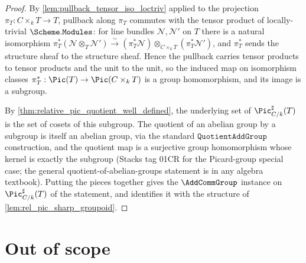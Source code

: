 \begin{proof}
  By \cref{lem:pullback_tensor_iso_loctriv} applied to the projection
  \(\pi_T : C \times_k T \to T\), pullback along \(\pi_T\) commutes with the
  tensor product of locally-trivial \(\Scheme.\mathtt{Modules}\): for line
  bundles \(\mathcal{N}, \mathcal{N}'\) on \(T\) there is a natural isomorphism
  \(\pi_T^*(\mathcal{N} \otimes_T \mathcal{N}')
     \xrightarrow{\sim}
   (\pi_T^*\mathcal{N}) \otimes_{C \times_k T} (\pi_T^*\mathcal{N}')\), and
  \(\pi_T^*\) sends the structure sheaf to the structure sheaf. Hence the
  pullback carries tensor products to tensor products and the unit to the
  unit, so the induced map on isomorphism classes
  \(\pi_T^{*} : \Pic(T) \to \Pic(C \times_k T)\) is a group homomorphism, and
  its image is a subgroup.

  By \cref{thm:relative_pic_quotient_well_defined}, the underlying set of
  \(\Pic^{\sharp}_{C/k}(T)\) is the set of cosets of this subgroup. The
  quotient of an abelian group by a subgroup is itself an abelian group, via
  the standard \(\mathtt{QuotientAddGroup}\) construction, and the quotient
  map is a surjective group homomorphism whose kernel is exactly the subgroup
  (Stacks tag 01CR for the Picard-group special case; the general
  quotient-of-abelian-groups statement is in any algebra textbook). Putting
  the pieces together gives the \(\AddCommGroup\) instance on
  \(\Pic^{\sharp}_{C/k}(T)\) of the statement, and identifies it with the
  structure of \cref{lem:rel_pic_sharp_groupoid}.
\end{proof}

\section{Out of scope}
\label{sec:tensorobj_out_of_scope}

